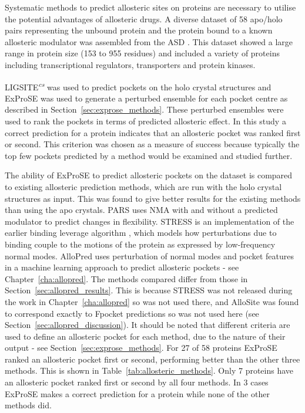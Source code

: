 Systematic methods to predict allosteric sites on proteins are necessary to utilise the potential advantages of allosteric drugs.
A diverse dataset of 58 apo/holo pairs representing the unbound protein and the protein bound to a known allosteric modulator was assembled from the ASD \cite{Shen2016}.
This dataset showed a large range in protein size (153 to 955 residues) and included a variety of proteins including transcriptional regulators, transporters and protein kinases.

LIGSITE\textsuperscript{\it cs} was used to predict pockets on the holo crystal structures and ExProSE was used to generate a perturbed ensemble for each pocket centre as described in Section~\ref{sec:exprose_methods}.
These perturbed ensembles were used to rank the pockets in terms of predicted allosteric effect.
In this study a correct prediction for a protein indicates that an allosteric pocket was ranked first or second.
This criterion was chosen as a measure of success because typically the top few pockets predicted by a method would be examined and studied further.

The ability of ExProSE to predict allosteric pockets on the dataset is compared to existing allosteric prediction methods, which are run with the holo crystal structures as input.
This was found to give better results for the existing methods than using the apo crystals.
PARS \cite{Panjkovich2014} uses NMA with and without a predicted modulator to predict changes in flexibility.
STRESS \cite{Clarke2016} is an implementation of the earlier binding leverage algorithm \cite{Mitternacht2011}, which models how perturbations due to binding couple to the motions of the protein as expressed by low-frequency normal modes.
AlloPred \cite{Greener2015} uses perturbation of normal modes and pocket features in a machine learning approach to predict allosteric pockets - see Chapter~\ref{cha:allopred}.
The methods compared differ from those in Section~\ref{sec:allopred_results}.
This is because STRESS was not released during the work in Chapter~\ref{cha:allopred} so was not used there, and AlloSite was found to correspond exactly to Fpocket predictions so was not used here (see Section~\ref{sec:allopred_discussion}).
It should be noted that different criteria are used to define an allosteric pocket for each method, due to the nature of their output - see Section~\ref{sec:exprose_methods}.
For 27 of 58 proteins ExProSE ranked an allosteric pocket first or second, performing better than the other three methods.
This is shown in Table~\ref{tab:allosteric_methods}.
Only 7 proteins have an allosteric pocket ranked first or second by all four methods.
In 3 cases ExProSE makes a correct prediction for a protein while none of the other methods did.

